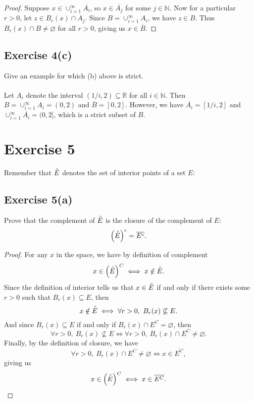 \documentclass[12pt]{article}
\newenvironment{problem}
    {\begin{lrbox}{\mybox}\begin{minipage}{\textwidth-10pt}}
    {\end{minipage}\end{lrbox}\framebox[6.5in]{\usebox{\mybox}}}
\newcommand{\clo}[1]{\overline{#1}}
\newcommand{\N}{\mathbb{N}}
\newcommand{\R}{\mathbb{R}}
\let\emptyset\varnothing
\begin{document}
\begin{proof}
    Suppose $x\in\cup_{i=1}^\infty \overline{A_i}$, so $x\in\clo{A_j}$ for some $j\in\N$. Now for a particular $r>0$, let $z\in B_r(x)\cap A_j$. Since $B = \cup_{i=1}^\infty A_i$, we have $z\in B$. Thus $B_r(x)\cap B\ne\emptyset$ for all $r>0$, giving us $x\in\clo{B}$.
    
\end{proof}

\subsection*{Exercise 4(c)}
\begin{problem}
    Give an example for which (b) above is strict.  
\end{problem}
\paragraph{}

Let $A_i$ denote the interval $(1/i, 2) \subseteq\R$ for all $i\in\N$. Then $B=\cup _{i=1}^{\infty} A_i = (0,2)$ and $\clo{B}=[0,2]$. However, we have $\clo{A_i}=[1/i,2]$ and $\cup_{i=1}^{\infty} \overline{A_i} = (0,2]$, which is a strict subset of $B$.

\section*{Exercise 5}
\begin{problem}
    Remember that $\accentset{\circ}{E}$ denotes the set of interior points of a set $E$:
\end{problem}

\subsection*{Exercise 5(a)}
\begin{problem}
    Prove that the complement of $\accentset{\circ}{E}$ is the closure of the complement of $E$:
    \begin{equation}
    \left ( \accentset{\circ}{E} \right )^c = \overline{E^c}.
    \end{equation}
\end{problem}

\begin{proof}
    For any $x$ in the space, we have by definition of complement
    \[x\in\left(\accentset{\circ}{E}\right)^C \iff x\notin\accentset{\circ}{E}.\]
    Since the definition of interior tells us that $x\in\accentset{\circ}{E}$ if and only if there exists some $r>0$ such that $B_r(x)\subseteq E$, then
    \[x\notin\accentset{\circ}{E} \iff \forall r>0,\ B_r(x)\not\subseteq E.\]
    And since $B_r(x)\subseteq E$ if and only if $B_r(x)\cap E^C=\emptyset$, then
    \[\forall r>0,\ B_r(x)\not\subseteq E \iff \forall r>0,\ B_r(x)\cap E^C \ne\emptyset.\]
    Finally, by the definition of closure, we have
    \[\forall r>0,\ B_r(x)\cap E^C \ne\emptyset \iff x\in\clo{E^C},\]
    giving us
    \[x\in\left(\accentset{\circ}{E}\right)^C \iff x\in\clo{E^C}.\]
    
\end{proof}
\end{document}
